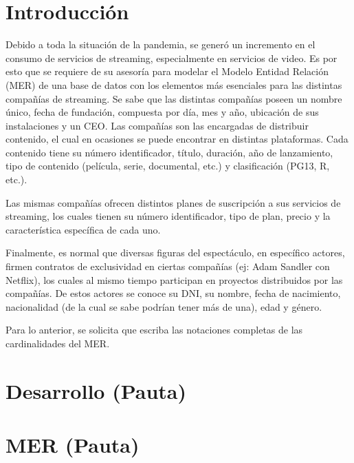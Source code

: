 \documentclass[letterpaper]{article}
\begin{document}
\section{Introducción}

Debido a toda la situación de la pandemia, se generó un incremento en el consumo de servicios de streaming, especialmente en servicios de video. Es por esto que se requiere de su asesoría para modelar el Modelo Entidad Relación (MER) de una base de datos con los elementos más esenciales para las distintas compañías de streaming. Se sabe que las distintas compañías poseen un nombre único, fecha de fundación, compuesta por día, mes y año, ubicación de sus instalaciones y un CEO. Las compañías son las encargadas de distribuir contenido, el cual en ocasiones se puede encontrar en distintas plataformas. Cada contenido tiene su número identificador, título, duración, año de lanzamiento, tipo de contenido (película, serie, documental, etc.) y clasificación (PG13, R, etc.).

Las mismas compañías ofrecen distintos planes de suscripción a sus servicios de streaming, los cuales tienen su número identificador, tipo de plan, precio y la característica específica de cada uno.

Finalmente, es normal que diversas figuras del espectáculo, en específico actores, firmen contratos de exclusividad en ciertas compañías (ej: Adam Sandler con Netflix), los cuales al mismo tiempo participan en proyectos distribuidos por las compañías. De estos actores se conoce su DNI, su nombre, fecha de nacimiento, nacionalidad (de la cual se sabe podrían tener más de una), edad y género.

Para lo anterior, se solicita que escriba las notaciones completas de las cardinalidades del MER.

\section{Desarrollo (Pauta)}



\section{MER (Pauta)}

  
  
\end{document}
